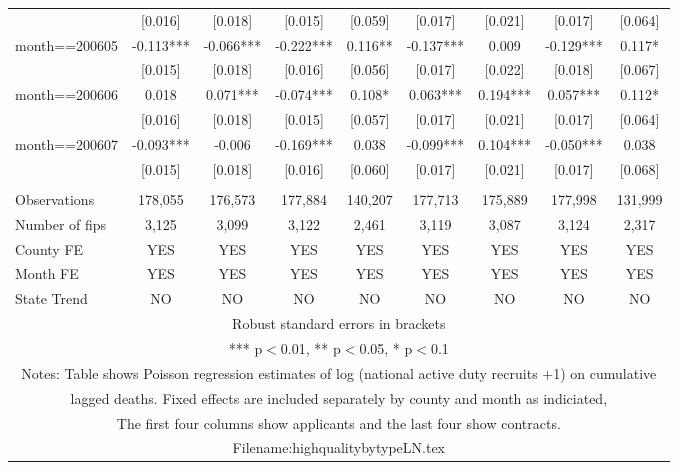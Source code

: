 \documentclass[]{article}
\begin{document}
\begin{tabular}{lcccccccc}
 & [0.016] & [0.018] & [0.015] & [0.059] & [0.017] & [0.021] & [0.017] & [0.064] \\
month==200605 & -0.113*** & -0.066*** & -0.222*** & 0.116** & -0.137*** & 0.009 & -0.129*** & 0.117* \\
 & [0.015] & [0.018] & [0.016] & [0.056] & [0.017] & [0.022] & [0.018] & [0.067] \\
month==200606 & 0.018 & 0.071*** & -0.074*** & 0.108* & 0.063*** & 0.194*** & 0.057*** & 0.112* \\
 & [0.016] & [0.018] & [0.015] & [0.057] & [0.017] & [0.021] & [0.017] & [0.064] \\
month==200607 & -0.093*** & -0.006 & -0.169*** & 0.038 & -0.099*** & 0.104*** & -0.050*** & 0.038 \\
 & [0.015] & [0.018] & [0.016] & [0.060] & [0.017] & [0.021] & [0.017] & [0.068] \\
 &  &  &  &  &  &  &  &  \\
Observations & 178,055 & 176,573 & 177,884 & 140,207 & 177,713 & 175,889 & 177,998 & 131,999 \\
Number of fips & 3,125 & 3,099 & 3,122 & 2,461 & 3,119 & 3,087 & 3,124 & 2,317 \\
County FE & YES & YES & YES & YES & YES & YES & YES & YES \\
Month FE & YES & YES & YES & YES & YES & YES & YES & YES \\
 State Trend & NO & NO & NO & NO & NO & NO & NO & NO \\ \hline
\multicolumn{9}{c}{ Robust standard errors in brackets} \\
\multicolumn{9}{c}{ *** p$<$0.01, ** p$<$0.05, * p$<$0.1} \\
\multicolumn{9}{c}{ Notes: Table shows Poisson regression estimates of log (national active duty recruits +1) on cumulative} \\
\multicolumn{9}{c}{ lagged deaths. Fixed effects are included separately by county and month as indiciated,} \\
\multicolumn{9}{c}{ The first four columns show applicants and the last four show contracts.} \\
\multicolumn{9}{c}{ Filename:highqualitybytypeLN.tex} \\
\end{tabular}
\end{document}
